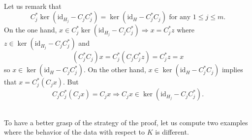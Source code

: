 \documentclass[11pt,a4paper,reqno]{amsart}
\numberwithin{equation}{section}
\theoremstyle{definition}
\newcommand{\<}{\ensuremath \leq}
\renewcommand{\>}{\ensuremath \geq}
\begin{document}
\hfill \\

Let us remark that $$C_j^*\ker(\mathrm{id}_{H_j}-C_jC_j^*)=\ker(\mathrm{id}_H-C_j^*C_j) \text{ for any } 1 \leq j \leq m.$$ On the one hand, $x \in C_j^*\ker(\mathrm{id}_{H_j}-C_jC_j^*) \Longrightarrow x=C_j^*z $ where $z \in \ker(\mathrm{id}_{H_j}-C_jC_j^*)$ and $$(C_j^*C_j)x=C_j^*(C_jC_j^*z)=C_j^*z=x$$ so $x \in \ker(\mathrm{id}_H-C_jC_j^*).$  On the other hand, $x \in \ker(\mathrm{id}_H-C_j^*C_j)$ implies that $ x=C_j^*(C_jx)$. But $$C_jC_j^*(C_jx)=C_jx \Longrightarrow C_jx \in \ker(\mathrm{id}_{H_j}-C_jC_j^*).$$  





\hfill \\

To have a better grasp of the strategy of the proof, let us compute two examples where the behavior of the data with respect to $K$ is different. 
\end{document}
